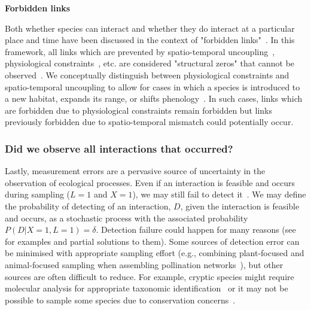 \documentclass[12pt]{article}
\begin{document}
\begin{spacing}{2.0}


          \textbf{Forbidden links}

            Both whether species can interact and whether they do interact at a particular place and time have been discussed in the context of "forbidden links"~\citep{Jordano2016}. In this framework, all links which are prevented by spatio-temporal uncoupling~\citep{Jordano1987}, physiological constraints~\citep{Jordano1987,More2012}, etc. are considered "structural zeros" that cannot be observed~\citep{Jordano2016}. We conceptually distinguish between physiological constraints and spatio-temporal uncoupling to allow for cases in which a species is introduced to a new habitat, expands its range, or shifts phenology~\citep{Gravel2013}. In such cases, links which are forbidden due to physiological constraints remain forbidden but links previously forbidden due to spatio-temporal mismatch could potentially occur. 


        \subsubsection*{Did we observe all interactions that occurred?} 

          Lastly, measurement errors are a pervasive source of uncertainty in the observation of ecological processes. Even if an interaction is feasible and occurs during sampling ($L = 1$ and $X = 1$), we may still fail to detect it~\citep{Jordano2016,Weinstein2017}. We may define the probability of detecting of an interaction, $D$, given the interaction is feasible and occurs, as a stochastic process with the associated probability $P(D|X=1,L=1)=\delta$. Detection failure could happen for many reasons (see~\citet{Wirta2014} for examples and partial solutions to them). Some sources of detection error can be minimised with appropriate sampling effort (e.g., combining plant-focused and animal-focused sampling when assembling pollination networks~\citet{Jordano2016}), but other sources are often difficult to reduce. For example, cryptic species might require molecular analysis for appropriate taxonomic identification~\citep{Wirta2014,Frost2016} or it may not be possible to sample some species due to conservation concerns~\citep{Lagrue2015}. 



\end{spacing}
\end{document}
